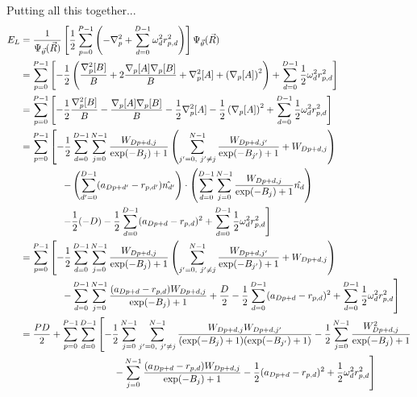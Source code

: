 \documentclass[12pt]{article}
\begin{document}
Putting all this together...
\begin{align*}
E_L &= \frac{1}{\Psi_{\vec{\theta}}(\vec{R})} \left[
\frac{1}{2} \sum_{p = 0}^{P-1} \left( -\nabla_p^2 + \sum_{d=0}^{D-1} \omega_d^2 r_{p,d}^2 \right)  \right] \Psi_{\vec{\theta}}(\vec{R})\\
&= \sum_{p=0}^{P-1} \left[  -\frac{1}{2} \left( \frac{\nabla_p^2[B]}{B} + 2\frac{\nabla_p[A]\nabla_p[B]}{B}+\nabla_p^2[A] + \left( \nabla_p[A] \right)^2 \right) + \sum_{d=0}^{D-1} \frac{1}{2} \omega_d^2 r_{p,d}^2
 \right]\\
 &= \sum_{p=0}^{P-1} \left[ -\frac{1}{2} \frac{\nabla_p^2[B]}{B} -\frac{\nabla_p[A]\nabla_p[B]}{B}-\frac{1}{2} \nabla_p^2[A] -\frac{1}{2} \left( \nabla_p[A] \right)^2 + \sum_{d=0}^{D-1} \frac{1}{2} \omega_d^2 r_{p,d}^2
 \right]\\
&= \sum_{p=0}^{P-1} \left[
-\frac{1}{2} \sum_{d=0}^{D-1} \sum_{j=0}^{N-1} \frac{W_{Dp+d,j}}{\exp(-B_j)+1} \left( \sum_{j'=0,\ j'\neq j}^{N-1} \frac{W_{Dp+d,j'}}{\exp(-B_{j'})+1} + W_{Dp+d,j} \right) \right.\\
& \hspace*{1.5cm} \left.
- \left( \sum_{d'=0}^{D-1} (a_{Dp+d'} -r_{p,d'} ) \hat{n_{d'}} \right) \cdot \left( \sum_{d=0}^{D-1} \sum_{j=0}^{N-1} \frac{W_{Dp+d,j}}{\exp(-B_j)+1} \hat{n_d} \right) \right.\\
& \hspace*{1.5cm} \left.
-\frac{1}{2} (-D)
-\frac{1}{2} \sum_{d=0}^{D-1} (a_{Dp+d} -r_{p,d} )^2
+ \sum_{d=0}^{D-1} \frac{1}{2} \omega_d^2 r_{p,d}^2 \right]\\
&= \sum_{p=0}^{P-1} \left[ -\frac{1}{2} \sum_{d=0}^{D-1} \sum_{j=0}^{N-1} \frac{W_{Dp+d,j}}{\exp(-B_j)+1} \left(  \sum_{j'=0,\ j'\neq j}^{N-1} \frac{W_{Dp+d,j'}}{\exp(-B_{j'})+1} + W_{Dp+d,j} \right) \right.\\
& \hspace*{1.5cm} \left.
- \sum_{d=0}^{D-1} \sum_{j=0}^{N-1}  \frac{(a_{Dp+d} -r_{p,d} ) W_{Dp+d,j}}{\exp(-B_j)+1}
+\frac{D}{2}
-\frac{1}{2} \sum_{d=0}^{D-1} (a_{Dp+d} -r_{p,d} )^2
+ \sum_{d=0}^{D-1} \frac{1}{2} \omega_d^2 r_{p,d}^2
 \right]\\
 &= \frac{PD}{2} +\sum_{p=0}^{P-1} \sum_{d=0}^{D-1} \left[ -\frac{1}{2}  \sum_{j=0}^{N-1} \sum_{j'=0, \ j'\neq j}^{N-1} \frac{W_{Dp+d,j}W_{Dp+d,j'}}{(\exp(-B_j)+1)(\exp(-B_{j'})+1)}
-\frac{1}{2} \sum_{j=0}^{N-1} \frac{W_{Dp+d,j}^2}{\exp(-B_j)+1} \right.\\
&\hspace*{3.4cm} \left. -\sum_{j=0}^{N-1} \frac{(a_{Dp+d} -r_{p,d} ) W_{Dp+d,j}}{\exp(-B_j)+1} - \frac{1}{2} (a_{Dp+d}-r_{p,d})^2 + \frac{1}{2} \omega_d^2 r_{p,d}^2 \right]
\end{align*}
\end{document}
